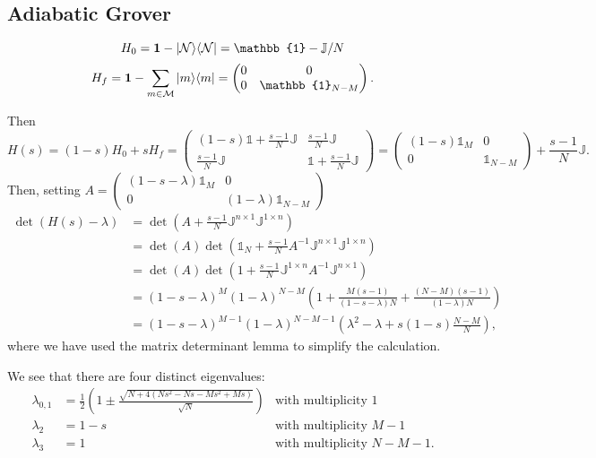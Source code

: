 \subsection{Adiabatic Grover}
\[ H_0 = \vec{1} - \ketbra{\mathcal{N}}{\mathcal{N}} = \mathbb{1}-\mathbb{J}/N \]
\[ H_f = \vec{1} - \sum_{m\in\mathcal{M}}\ketbra{m}{m} = \begin{pmatrix}
0 & 0 \\ 0 & \mathbb{1}_{N-M}
\end{pmatrix}.\]

Then
\[ H(s) = (1-s)H_0 + sH_f = \begin{pmatrix}
(1-s)\mathbb{1} +\frac{s-1}{N}\mathbb{J} & \frac{s-1}{N}\mathbb{J} \\
\frac{s-1}{N}\mathbb{J} & \mathbb{1} + \frac{s-1}{N}\mathbb{J}
\end{pmatrix} = \begin{pmatrix}
(1-s)\mathbb{1}_M & 0 \\ 0 & \mathbb{1}_{N-M}
\end{pmatrix} + \frac{s-1}{N}\mathbb{J}. \]
Then, setting $A = \begin{pmatrix}
(1-s-\lambda)\mathbb{1}_M & 0 \\ 0 & (1-\lambda)\mathbb{1}_{N-M}
\end{pmatrix}$
\begin{align*}
\det(H(s)-\lambda) &= \det \left(A + \frac{s-1}{N}\mathbb{J}^{n\times 1}\mathbb{J}^{1\times n}\right) \\
&= \det(A)\det \left(\mathbb{1}_N + \frac{s-1}{N}A^{-1}\mathbb{J}^{n\times 1}\mathbb{J}^{1\times n}\right) \\
&= \det(A)\det \left(1 + \frac{s-1}{N}\mathbb{J}^{1\times n}A^{-1}\mathbb{J}^{n\times 1}\right) \\
&= (1-s-\lambda)^{M}(1-\lambda)^{N-M}\left(1 + \frac{M(s-1)}{(1-s-\lambda)N} + \frac{(N-M)(s-1)}{(1-\lambda)N}\right) \\
&= (1-s-\lambda)^{M-1}(1-\lambda)^{N-M-1}\left(\lambda^2 - \lambda + s(1-s)\frac{N-M}{N}\right),
\end{align*}
where we have used the matrix determinant lemma to simplify the calculation.

We see that there are four distinct eigenvalues:
\begin{align*}
\lambda_{0,1} &= \frac{1}{2}\left(1\pm \frac{\sqrt{N+4(Ns^2-Ns-Ms^2+Ms)}}{\sqrt{N}}\right) &\text{with multiplicity $1$}\\
\lambda_{2} &= 1-s &\text{with multiplicity $M-1$}\\
\lambda_{3} &= 1 &\text{with multiplicity $N-M-1$.}
\end{align*}


